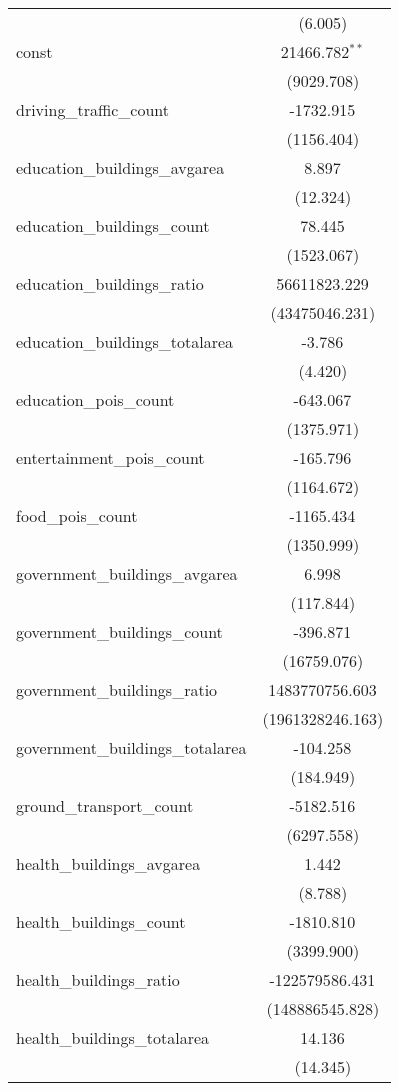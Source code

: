 \begin{table}[!htbp]
\begin{tabular}{@{\extracolsep{5pt}}lc}
  & (6.005) \\
 const & 21466.782$^{**}$ \\
  & (9029.708) \\
 driving_traffic_count & -1732.915$^{}$ \\
  & (1156.404) \\
 education_buildings_avgarea & 8.897$^{}$ \\
  & (12.324) \\
 education_buildings_count & 78.445$^{}$ \\
  & (1523.067) \\
 education_buildings_ratio & 56611823.229$^{}$ \\
  & (43475046.231) \\
 education_buildings_totalarea & -3.786$^{}$ \\
  & (4.420) \\
 education_pois_count & -643.067$^{}$ \\
  & (1375.971) \\
 entertainment_pois_count & -165.796$^{}$ \\
  & (1164.672) \\
 food_pois_count & -1165.434$^{}$ \\
  & (1350.999) \\
 government_buildings_avgarea & 6.998$^{}$ \\
  & (117.844) \\
 government_buildings_count & -396.871$^{}$ \\
  & (16759.076) \\
 government_buildings_ratio & 1483770756.603$^{}$ \\
  & (1961328246.163) \\
 government_buildings_totalarea & -104.258$^{}$ \\
  & (184.949) \\
 ground_transport_count & -5182.516$^{}$ \\
  & (6297.558) \\
 health_buildings_avgarea & 1.442$^{}$ \\
  & (8.788) \\
 health_buildings_count & -1810.810$^{}$ \\
  & (3399.900) \\
 health_buildings_ratio & -122579586.431$^{}$ \\
  & (148886545.828) \\
 health_buildings_totalarea & 14.136$^{}$ \\
  & (14.345) \\

\end{tabular}
\end{table}
